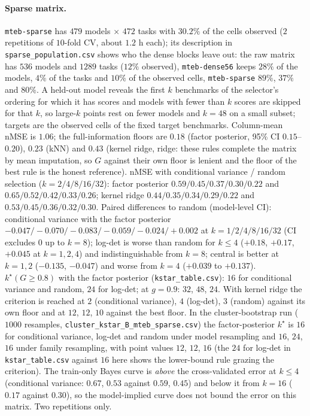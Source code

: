 \paragraph{Sparse matrix.} \texttt{mteb-sparse} has $479$ models $\times$ $472$ tasks with $30.2\%$ of the cells observed ($2$ repetitions of $10$-fold CV, about $1.2$ h each); its description in \texttt{sparse\_population.csv} shows who the dense blocks leave out: the raw matrix has $536$ models and $1289$ tasks ($12\%$ observed), \texttt{mteb-dense56} keeps $28\%$ of the models, $4\%$ of the tasks and $10\%$ of the observed cells, \texttt{mteb-sparse} $89\%$, $37\%$ and $80\%$. A held-out model reveals the first $k$ benchmarks of the selector's ordering for which it has scores and models with fewer than $k$ scores are skipped for that $k$, so large-$k$ points rest on fewer models and $k=48$ on a small subset; targets are the observed cells of the fixed target benchmarks. Column-mean nMSE is $1.06$; the full-information floors are $0.18$ (factor posterior, 95\% CI $0.15$--$0.20$), $0.23$ (kNN) and $0.43$ (kernel ridge, ridge: these rules complete the matrix by mean imputation, so $G$ against their own floor is lenient and the floor of the best rule is the honest reference). nMSE with conditional variance / random selection ($k=2/4/8/16/32$): factor posterior $0.59/0.45/0.37/0.30/0.22$ and $0.65/0.52/0.42/0.33/0.26$; kernel ridge $0.44/0.35/0.34/0.29/0.22$ and $0.53/0.45/0.36/0.32/0.30$. Paired differences to random (model-level CI): conditional variance with the factor posterior $-0.047/-0.070/-0.083/-0.059/-0.024/+0.002$ at $k=1/2/4/8/16/32$ (CI excludes $0$ up to $k=8$); log-det is worse than random for $k\le4$ ($+0.18$, $+0.17$, $+0.045$ at $k=1,2,4$) and indistinguishable from $k=8$; central is better at $k=1,2$ ($-0.135$, $-0.047$) and worse from $k=4$ ($+0.039$ to $+0.137$). $k^\star(G\ge0.8)$ with the factor posterior (\texttt{kstar\_table.csv}): $16$ for conditional variance and random, $24$ for log-det; at $g=0.9$: $32$, $48$, $24$. With kernel ridge the criterion is reached at $2$ (conditional variance), $4$ (log-det), $3$ (random) against its own floor and at $12$, $12$, $10$ against the best floor. In the cluster-bootstrap run ($1000$ resamples, \texttt{cluster\_kstar\_B\_mteb\_sparse.csv}) the factor-posterior $k^\star$ is $16$ for conditional variance, log-det and random under model resampling and $16$, $24$, $16$ under family resampling, with point values $12$, $12$, $16$ (the $24$ for log-det in \texttt{kstar\_table.csv} against $16$ here shows the lower-bound rule grazing the criterion). The train-only Bayes curve is \emph{above} the cross-validated error at $k\le4$ (conditional variance: $0.67$, $0.53$ against $0.59$, $0.45$) and below it from $k=16$ ($0.17$ against $0.30$), so the model-implied curve does not bound the error on this matrix. Two repetitions only.

